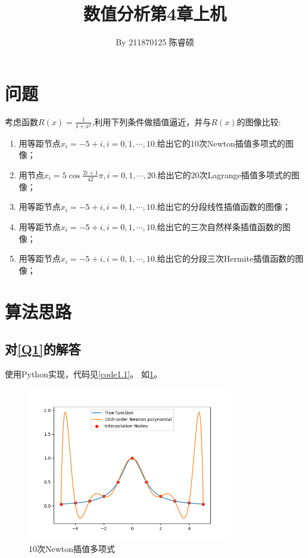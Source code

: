 \documentclass[a4paper,11pt,notitlepage]{article}
\title{\vspace{-1.5cm} \textbf{\huge{数值分析第4章上机}}\vspace{-1em}}
\author{By 211870125 陈睿硕}
\date{}
\begin{document}
\maketitle
\vspace{-1cm}
\thispagestyle{fancy}

\section{问题}
\begin{adjustwidth}{1em}{0pt}
    考虑函数$R(x)=\frac{1}{1+x^2}$,利用下列条件做插值逼近，并与$R(x)$的图像比较:
\begin{enumerate}[label=\textbf{Q\arabic*}]
    \item 用等距节点$x_{i}=-5+i,i=0,1,\cdots,10.$给出它的10次Newton插值多项式的图像；\label{Q1}\notag
    \item 用节点$x_{i}=5\cos{\frac{2i+1}{42}\pi},i=0,1,\cdots,20.$给出它的20次Lagrange插值多项式的图像；\label{Q2}\notag
    \item 用等距节点$x_{i}=-5+i,i=0,1,\cdots,10.$给出它的分段线性插值函数的图像；\label{Q3}\notag
    \item 用等距节点$x_{i}=-5+i,i=0,1,\cdots,10.$给出它的三次自然样条插值函数的图像；\label{Q4}\notag
    \item 用等距节点$x_{i}=-5+i,i=0,1,\cdots,10.$给出它的分段三次Hermite插值函数的图像；\label{Q5}\notag
\end{enumerate}
\end{adjustwidth}

\section{算法思路}
\subsection{对\ref{Q1}的解答}
使用Python实现，代码见\cref{code1.1}。
如\cref{pic:1}。
\begin{figure}[H]
    \centering
    \includegraphics[width=0.8\textwidth]{../picture/Fourth_Week_1A.png}
    \caption{10次Newton插值多项式}
    \label{pic:1}
\end{figure}
\end{document}
